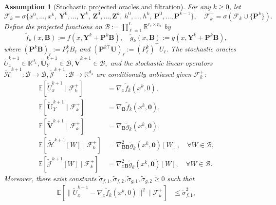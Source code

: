 \documentclass{pkumelon}
\theoremstyle{plain}
\newtheorem{assumption}{Assumption}
\newcommand{\R}{\mathbb{R}}
\newcommand{\E}{\mathbb{E}}
\begin{document}
\begin{assumption}[Stochastic projected oracles and filtration]\label{as:A2-1}
For any $k \geq 0$, let
\begin{equation*}
\mathcal F_k
\!=\sigma\{x^0,\ldots,x^k,\ \boldsymbol{Y}^0,\ldots,\boldsymbol{Y}^k,\ \boldsymbol{Z}^0,\ldots,\boldsymbol{Z}^k,\ h^0,\ldots,h^k,\ \boldsymbol{P}^0,\ldots,\boldsymbol{P}^{k-1}\}, \quad
\mathcal F_k^{+}
\!=\sigma(\mathcal F_k \cup\{\boldsymbol{P}^k\}).
\end{equation*}
Define the projected functions on $\mathcal B:=\prod_{\ell=1}^L \R^{r_\ell\times n_\ell}$ by
\begin{equation*}
\tilde f_k(x,\boldsymbol{B}):=f(x,\boldsymbol{Y}^k+\boldsymbol{P}^k\boldsymbol{B}),\quad \tilde g_k(x,\boldsymbol{B}):=g(x,\boldsymbol{Y}^k+\boldsymbol{P}^k\boldsymbol{B}),
\end{equation*}
where $(\boldsymbol{P}^k\boldsymbol{B})_\ell:=P_\ell^k B_\ell$ and $(\boldsymbol{P}^{k\top}\boldsymbol{U})_\ell:=(P_\ell^k)^\top U_\ell$. The stochastic oracles $\tilde U_x^{k+1}\in\R^{d_x}, \tilde{\boldsymbol U}_Y^{k+1}\in\mathcal B, \tilde{\boldsymbol V}^{k+1}\in\mathcal B,$ and the stochastic linear operators $\tilde{\mathcal H}^{k+1}:\mathcal B\to\mathcal B, \tilde{\mathcal J}^{k+1}:\mathcal B\to\R^{d_x}$ are conditionally unbiased given $\mathcal F_k^+$:
\begin{equation*}
\begin{aligned}
\E[\tilde U_x^{k+1}\mid \mathcal F_k^+]&=\nabla_x \tilde f_k(x^k,0),\\
\E[\tilde{\boldsymbol U}_Y^{k+1}\mid \mathcal F_k^+]&=\nabla_{\boldsymbol B} \tilde f_k(x^k,\mathbf 0),\\
\E[\tilde{\boldsymbol V}^{k+1}\mid \mathcal F_k^+]&=\nabla_{\boldsymbol B} \tilde g_k(x^k,\mathbf 0),\\
\E[\tilde{\mathcal H}^{k+1}[W]\mid \mathcal F_k^+]
\!&=\nabla_{\boldsymbol B\boldsymbol B}^2\tilde g_k(x^k,\mathbf 0)[W], \quad \forall W\in\mathcal B,\\
\E[\tilde{\mathcal J}^{k+1}[W]\mid \mathcal F_k^+]
\!&=\nabla_{x\boldsymbol B}^2\tilde g_k(x^k,\mathbf 0)[W], \quad \forall W\in\mathcal B.
\end{aligned}
\end{equation*}
Moreover, there exist constants $\tilde{\sigma}_{f,1}, \tilde{\sigma}_{f,2}, \tilde{\sigma}_{g,1}, \tilde{\sigma}_{g,2}\ge 0$ such that
\begin{equation*}
\begin{aligned}
\E [ \| \tilde U_x^{k+1} - \nabla_x \tilde f_k(x^k, 0) \|^2 \mid \mathcal F_k^+ ] &\leq \tilde{\sigma}_{f,1}^2,\\

\end{aligned}
\end{equation*}
\end{assumption}
\end{document}
